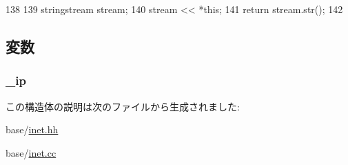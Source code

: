 \begin{DoxyCode}
138 {
139     stringstream stream;
140     stream << *this;
141     return stream.str();
142 }
\end{DoxyCode}


\subsection{変数}
\hypertarget{structNet_1_1IpAddress_a87153b713af02b56e608fc9b7257f681}{
\subsubsection[{\_\-ip}]{ {\bf \_\-ip}}}
\label{structNet_1_1IpAddress_a87153b713af02b56e608fc9b7257f681}


この構造体の説明は次のファイルから生成されました:\begin{DoxyCompactItemize}
\item 
base/\hyperlink{inet_8hh}{inet.hh}\item 
base/\hyperlink{inet_8cc}{inet.cc}\end{DoxyCompactItemize}
